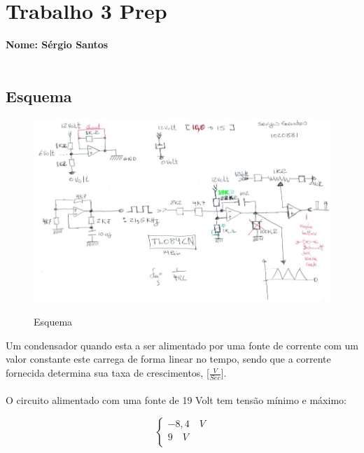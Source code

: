 \documentclass[titlepage, a4paper, 10pt, reqno, openany]{report}
\begin{document}
\renewcommand\thesection{\arabic{section}}
\renewcommand\thesubsection{\thesection.\arabic{subsection}}
\renewcommand\thesubsubsection{\thesection.\thesubsection.\arabic{subsubsection}}
\pagestyle{plain}%
\chapter*{Trabalho 3 Prep}
{\bf Nome: Sérgio Santos} \\
\hspace*{0.51cm}{\bf nº: 1020881}\\
\section{Esquema}
\begin{figure}[H]
	\centering
	\includegraphics[scale=0.7]{./image/esquema.jpg}\\
	\caption{Esquema}
\end{figure}
Um condensador quando esta a ser alimentado por uma fonte de corrente com um valor constante este carrega de forma linear no tempo, sendo que a corrente fornecida determina sua taxa de crescimentos, [$\frac{V}{Sec}$].\\ \\
O circuito alimentado com uma fonte de 19 Volt tem tensão mínimo e máximo: \\
\begin{minipage}[l]{0pt}
	$$\left\lbrace\begin{array}{c}
 	-8,4 \quad V \\
 	9 \quad V \\
 \end{array}\right.$$
\end{minipage}
\end{document}
